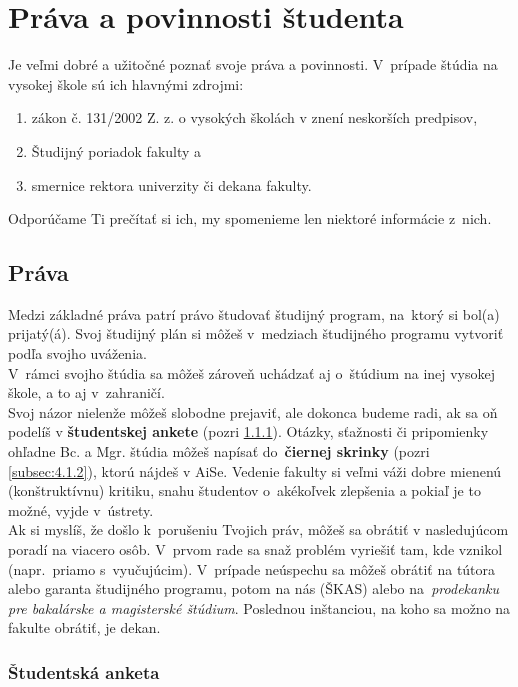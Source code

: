 \chapter{Práva a povinnosti študenta}

Je veľmi dobré a užitočné poznať svoje práva a povinnosti. V~prípade
štúdia na vysokej škole sú ich hlavnými zdrojmi:
\begin{enumerate}
\itemsep0em
\item zákon č. 131/2002 Z. z. o vysokých školách v znení neskorších predpisov,
\item Študijný poriadok fakulty a
\item smernice rektora univerzity či dekana fakulty.
\end{enumerate}
Odporúčame Ti prečítať si ich, my spomenieme len niektoré informácie
z~nich.


\section{Práva}

Medzi základné práva patrí právo študovať študijný program, na~ktorý
si bol(a) prijatý(á). Svoj študijný plán si môžeš v~medziach študijného
programu vytvoriť podľa svojho uváženia. \\

V~rámci svojho štúdia sa môžeš zároveň uchádzať aj o~štúdium na
inej vysokej škole, a to aj v~zahraničí. \\

Svoj názor nielenže môžeš slobodne prejaviť, ale dokonca budeme radi,
ak sa oň podelíš v \textbf{študentskej ankete} (pozri \ref{subsec:4.1.1}). Otázky, sťažnosti či pripomienky ohľadne Bc. a Mgr. štúdia môžeš napísať do~\textbf{čiernej skrinky} (pozri \ref{subsec:4.1.2}), ktorú nájdeš v AiSe. Vedenie fakulty si veľmi váži dobre mienenú (konštruktívnu) kritiku, snahu študentov o~akékoľvek zlepšenia
a pokiaľ je to možné, vyjde v~ústrety. \\

Ak si myslíš, že došlo k~porušeniu Tvojich práv, môžeš sa obrátiť v nasledujúcom poradí
 na viacero osôb. V~prvom rade sa snaž problém vyriešiť 
tam, kde vznikol (napr.\ priamo s~vyučujúcim). V~prípade neúspechu 
sa môžeš obrátiť na tútora alebo garanta študijného programu, potom na nás (ŠKAS) alebo na\emph{~prodekanku pre bakalárske a magisterské 
štúdium}. Poslednou inštanciou, na koho sa možno na fakulte obrátiť, je dekan.


\subsection{Študentská anketa} \label{subsec:4.1.1}


